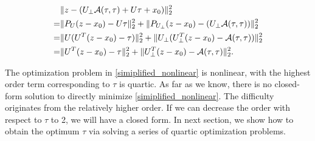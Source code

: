 \documentclass{article}
\theoremstyle{remark}
\begin{document}
\begin{equation}\label{simiplified_nonlinear}
\begin{aligned}
   &\|z -  (U_{\perp} {\cal A} (\tau,\tau) + U \tau +x_0)\|_2^2\\
 =&\|P_U(z-x_0)-U\tau\|_2^2+\|P_{U_{\perp}}(z-x_0)-(U_{\perp} {\cal A}(\tau,\tau))\|_2^2 \\
  =&\|U (U^T (z-x_0)-\tau)\|_2^2+\|U_\perp (U_{\perp}^T(z-x_0)- {\cal A}(\tau,\tau))\|_2^2 \\
 =&\|U^T (z-x_0)-\tau\|_2^2+\|U^T_{\perp}(z-x_0)- {\cal A} (\tau,\tau)\|_2^2.
\end{aligned}
\end{equation}

The optimization problem in \eqref{simiplified_nonlinear} is nonlinear, with the highest order term corresponding to $\tau$ is quartic. As far as we know, there is no closed-form solution to directly minimize \eqref{simiplified_nonlinear}. The difficulty originates from the relatively higher order. If we can decrease the order with respect to $\tau$ to 2, we will have a closed form. In next section, we show how to obtain the optimum $\tau$ via solving a series of quartic optimization problems.
\end{document}
